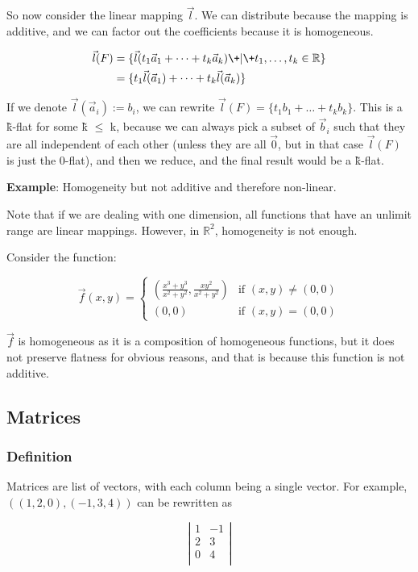\documentclass[11 pt, twoside]{article}
\begin{document}
So now consider the linear mapping $\vec{l}$. We can distribute because the
mapping is additive, and we can factor out the coefficients because it is
homogeneous.

\begin{align*}
\vec{l}(F) &= \{\vec{l}(t_1\vec{a}_1 + \dots + t_k\vec{a}_k) \+|\+ t_1, \dots, t_k \in \mathbb{R}\}\\
&= \{t_1 \vec{l}(\vec{a}_1) + \dots + t_k \vec{l}(\vec{a}_k)\}
\end{align*}

If we denote $\vec{l}(\vec{a}_i) := b_i$, we can rewrite $\vec{l}(F) = \{t_1
b_1 + \dots + t_k b_k\}$. This is a \~{k}-flat for some \~{k} $\leq$ k, because
we can always pick a subset of $\vec{b}_i$ such that they are all independent of
each other (unless they are all $\vec{0}$, but in that case $\vec{l}(F)$ is just
the 0-flat), and then we reduce, and the final result would be a \~{k}-flat.
\vspace{0.2cm}

\textbf{Example}: Homogeneity but not additive and therefore non-linear.

Note that if we are dealing with one dimension, all functions that have an
unlimit range are linear mappings. However, in $\mathbb{R}^2$, homogeneity is
not enough.

Consider the function:

\[
\vec{f}(x, y) =
\begin{cases}
(\frac{x^3 + y^3}{x^2 + y^2}, \frac{xy^2}{x^2+y^2}) & \mbox{if } (x,
y) \neq (0, 0)\\
(0, 0) & \mbox{if } (x, y) = (0,0)
\end{cases}
\]

$\vec{f}$ is homogeneous as it is a composition of homogeneous functions, but it
does not preserve flatness for obvious reasons, and that is because this
function is not additive.

\subsection{Matrices}
\subsubsection{Definition}
Matrices are list of vectors, with each column being a single vector. For
example, $((1,2,0),(-1, 3, 4))$ can be rewritten as

$$\left|\begin{array}{cc}
1 & -1\\
2 & 3\\
0 & 4\\
\end{array} \right|$$
\end{document}
